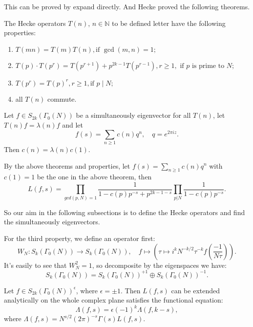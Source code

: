    This  can be proved by expand directly. And Hecke proved the following theorems.

    \begin{theorem}[Hecke]\label{Hecke1}
        The Hecke operators $T(n)$, $ n\in \mathbb{N}$ to be  defined letter have the following properties:
        \begin{enumerate}
            \item $T(m n)  =T(m)T(n), \text {if } \operatorname{gcd}(m, n)=1 ;$
            \item $T(p) \cdot T\left(p^{r}\right)  =T\left(p^{r+1}\right)+p^{2 k-1} T\left(p^{r-1}\right), r \geq 1, \text { if } p \text { is prime to } N \text {; }$
            \item $T\left(p^{r}\right) =T(p)^{r}, r \geq 1, \text {if } p \mid N;$
            \item all $T(n)$ commute.
        \end{enumerate}
    \end{theorem}
    
    \begin{theorem}[Hecke]\label{Hecke2}
        Let $f\in S_{2k}(\Gamma_0(N))$ be a simultaneously eigenvector for all $T(n)$, let $T(n)f=\lambda(n )f $ and let 
        $$f(s)=\sum_{n \geq 1} c(n) q^{n}, \quad q=e^{2 \pi i z}.$$
        Then $c(n)=\lambda(n)c(1)$.
    \end{theorem}

    \begin{remark}
        By the above theorems and properties, let $f(s)=\sum_{n \geq 1} c(n) q^{n}$  with  $c(1)=1$ be the one in the above theorem, then 
        $$L(f,s)=\prod_{gcd(p,N)=1}\frac{1}{1-c(p)p^{-s}+p^{2k-1-s}}\prod_{p\vert N }\frac{1}{1-c(p)p^{-s}}.$$
    \end{remark}

    So our aim in the following subsections is to define the Hecke operators and find the simultaneously eigenvectors.
    
    For the third property, we define an operator first:
    $$W_N:S_k(\Gamma_0(N))\to S_k(\Gamma_0(N)),\quad f\mapsto (\tau\mapsto i^kN^{-k/2}\tau^{-k}f(\frac{-1}{N\tau})).$$
    It's easily to see that $W_N^2=1$, so decomposite  by the eigenspaces we have: 
    $$S_k(\Gamma_0(N))=S_k(\Gamma_0(N))^{+1}\oplus S_k(\Gamma_0(N))^{-1}.$$

    \begin{theorem}[Hecke]
        Let $f\in S_{2k}(\Gamma_0(N))^\epsilon$, where $\epsilon=\pm 1$. Then $L(f,s)$  can be extended analytically on the whole complex plane satisfies the functional equation: 
        $$\Lambda(f,s)=\epsilon (-1)^k\Lambda(f,k-s),$$
        where $\Lambda(f ,s)=N^{s/2}(2\pi)^{-s}\Gamma(s)L(f,s)$.
    \end{theorem}

